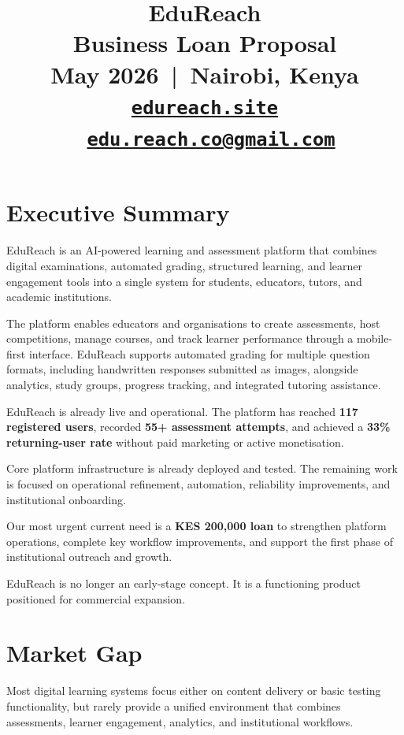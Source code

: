 \documentclass[a4paper,11pt]{article}
\title{
  \vspace{-2cm}
  {\color{violetbrand}\textbf{\Huge EduReach}}\\[0.25cm]
  {\color{slatedark}\Large Business Loan Proposal}\\[0.2cm]
  {\color{slatemid}\normalsize May 2026 \,|\, Nairobi, Kenya}\\[0.1cm]
  {\color{violetbrand}\small
    \href{https://edureach.site}{\texttt{edureach.site}}
    \textbar\
    \href{mailto:edu.reach.co@gmail.com}{\texttt{edu.reach.co@gmail.com}}}
}
\author{}
\date{}
\begin{document}
\maketitle
\thispagestyle{fancy}

\section{Executive Summary}

EduReach is an AI-powered learning and assessment platform that combines digital examinations, automated grading, structured learning, and learner engagement tools into a single system for students, educators, tutors, and academic institutions.

The platform enables educators and organisations to create assessments, host competitions, manage courses, and track learner performance through a mobile-first interface. EduReach supports automated grading for multiple question formats, including handwritten responses submitted as images, alongside analytics, study groups, progress tracking, and integrated tutoring assistance.

EduReach is already live and operational. The platform has reached \textbf{117 registered users}, recorded \textbf{55+ assessment attempts}, and achieved a \textbf{33\% returning-user rate} without paid marketing or active monetisation.

Core platform infrastructure is already deployed and tested. The remaining work is focused on operational refinement, automation, reliability improvements, and institutional onboarding.

Our most urgent current need is a \textbf{KES 200,000 loan} to strengthen platform operations, complete key workflow improvements, and support the first phase of institutional outreach and growth.

EduReach is no longer an early-stage concept. It is a functioning product positioned for commercial expansion.

\section{Market Gap}

Most digital learning systems focus either on content delivery or basic testing functionality, but rarely provide a unified environment that combines assessments, learner engagement, analytics, and institutional workflows.
\end{document}
